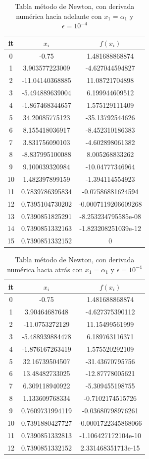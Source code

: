 \documentclass{article} %
\begin{document}
\begin{table}
\centering
\begin{tabular}{|c|c|c|}
\hline
it & $x_i$ & $f(x_i)$\\
\hline
0 & -0.75 & 1.481688868874\\
1 & 3.903577223009 & -4.627044594827\\
2 & -11.04140368885 & 11.08721704898\\
3 & -5.494889639004 & 6.199944609512\\
4 & -1.867468344657 & 1.575129111409\\
5 & 34.20085775123 & -35.13792544626\\
6 & 8.155418036917 & -8.452310186383\\
7 & 3.831756090103 & -4.602898061382\\
8 & -8.837995100088 & 8.005268833262\\
9 & 9.100039320984 & -10.04777346964\\
10 & 1.482397899159 & -1.394114554923\\
11 & 0.7839786395834 & -0.07586881624594\\
12 & 0.7395104730202 & -0.0007119206609268\\
13 & 0.7390851825291 & -8.253234795585e-08\\
14 & 0.7390851332163 & -1.823208251039e-12\\
15 & 0.7390851332152 & 0\\
\hline
\end{tabular}
\caption{Tabla método de Newton, con derivada numérica hacia adelante con $x_1 = \alpha_1$ y $\epsilon = 10^{-4}$}
\end{table}

\begin{table}
\centering
\begin{tabular}{|c|c|c|}
\hline
it & $x_i$ & $f(x_i)$\\
\hline
0 & -0.75 & 1.481688868874\\
1 & 3.90464687648 & -4.627375390112\\
2 & -11.0753272129 & 11.15499561999\\
3 & -5.488939884478 & 6.189763116371\\
4 & -1.876167263419 & 1.575520292109\\
5 & 32.16739504507 & -31.43670795756\\
6 & 13.48482733025 & -12.87778005621\\
7 & 6.309118940922 & -5.309455198755\\
8 & 1.133609768334 & -0.7102174515726\\
9 & 0.7609731994119 & -0.03680798976261\\
10 & 0.7391880427727 & -0.0001722345868066\\
11 & 0.7390851332813 & -1.106427172104e-10\\
12 & 0.7390851332152 & 2.331468351713e-15\\
\hline
\end{tabular}
\caption{Tabla método de Newton, con derivada numérica hacia atrás con $x_1 = \alpha_1$ y $\epsilon = 10^{-4}$}
\end{table}
\end{document}
